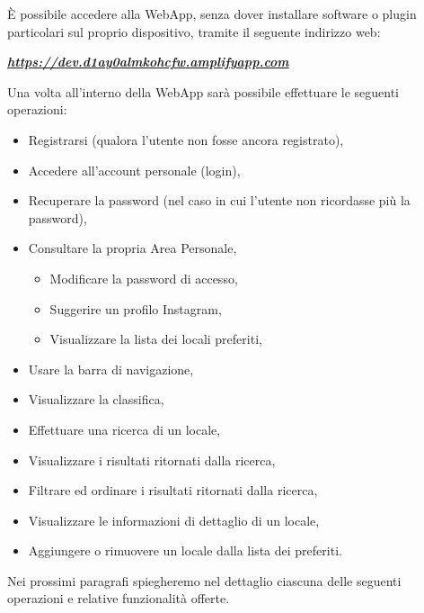
È possibile accedere alla WebApp, senza dover installare software o plugin particolari sul proprio dispositivo, tramite il seguente indirizzo web:

\begin{center}
\textsl{ \href{https://dev.d1ay0almkohcfw.amplifyapp.com}{\textbf{https://dev.d1ay0almkohcfw.amplifyapp.com} }}
\end{center}

Una volta all’interno della WebApp sarà possibile effettuare le seguenti operazioni:

\begin{itemize}
	\item Registrarsi (qualora l’utente non fosse ancora registrato),
	\item Accedere all'account personale (login),
	\item Recuperare la password (nel caso in cui l'utente non ricordasse più la password),
	\item Consultare la propria Area Personale,
	\begin{itemize}
	\item Modificare la password di accesso,
	\item Suggerire un profilo Instagram,
	\item Visualizzare la lista dei locali preferiti,
	\end{itemize}
	\item Usare la barra di navigazione,
	\item Visualizzare la classifica,
	\item Effettuare una ricerca di un locale,
	\item Visualizzare i risultati ritornati dalla ricerca,
	\item Filtrare ed ordinare i risultati ritornati dalla ricerca,
	\item Visualizzare le informazioni di dettaglio di un locale,
	\item Aggiungere o rimuovere un locale dalla lista dei preferiti.
\end{itemize}

Nei prossimi paragrafi spiegheremo nel dettaglio ciascuna delle seguenti operazioni e relative funzionalità offerte.
